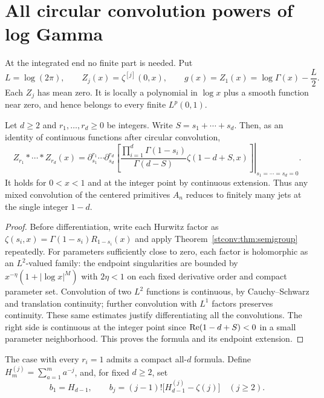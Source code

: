 \section{All circular convolution powers of log Gamma}
\label{stconv:sec:gamma}
At the integrated end no finite part is needed. Put
\begin{equation}\label{stconv:eq:gr}
 L=\log(2\pi),\qquad Z_j(x)=\zeta^{[j]}(0,x),\qquad
 g(x)=Z_1(x)=\log\Gamma(x)-\frac L2.
\end{equation}
Each $Z_j$ has mean zero. It is locally a polynomial in $\log x$ plus
a smooth function near zero, and hence belongs to every finite $L^p(0,1)$.

\begin{theorem}\label{stconv:thm:integrated}
Let $d\ge2$ and $r_1,\ldots,r_d\ge0$ be integers. Write
$S=s_1+\cdots+s_d$. Then, as an identity of continuous functions after
circular convolution,
\begin{equation}\label{stconv:eq:mixedintegrated}
 Z_{r_1}*\cdots*Z_{r_d}(x)
 =\left.
 \partial_{s_1}^{r_1}\cdots\partial_{s_d}^{r_d}
 \left[\frac{\prod_{i=1}^d\Gamma(1-s_i)}{\Gamma(d-S)}
              \zeta(1-d+S,x)\right]\right|_{s_1=\cdots=s_d=0}.
\end{equation}
It holds for $0<x<1$ and at the integer point by continuous extension.
Thus any mixed convolution of the centered primitives $A_n$ reduces to
finitely many jets at the single integer $1-d$.
\end{theorem}
\begin{proof}
Before differentiation, write each Hurwitz factor as
$\zeta(s_i,x)=\Gamma(1-s_i)R_{1-s_i}(x)$ and apply
Theorem~\ref{stconv:thm:semigroup} repeatedly. For parameters sufficiently close
to zero, each factor is holomorphic as an $L^2$-valued family: the
endpoint singularities are bounded by
$x^{-\eta}(1+|\log x|^M)$ with $2\eta<1$ on each fixed derivative
order and compact parameter set. Convolution of two $L^2$ functions is
continuous, by Cauchy--Schwarz and translation continuity; further
convolution with $L^1$ factors preserves continuity. These same estimates
justify differentiating all the convolutions. The right side is
continuous at the integer point since $\operatorname{Re}(1-d+S)<0$ in a small
parameter neighborhood. This proves the formula and its endpoint
extension.
\end{proof}

The case with every $r_i=1$ admits a compact all-$d$ formula. Define
$H_m^{(j)}=\sum_{a=1}^ma^{-j}$, and, for fixed $d\ge2$, set
\begin{equation}\label{stconv:eq:bd}
 b_1=H_{d-1},\qquad
 b_j=(j-1)!\big[H_{d-1}^{(j)}-\zeta(j)\big]\quad(j\ge2).
\end{equation}

